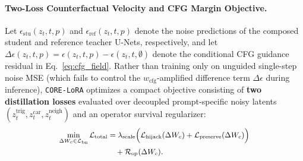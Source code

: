\documentclass[10pt,twocolumn,letterpaper]{article}
\begin{document}
\paragraph{Two-Loss Counterfactual Velocity and CFG Margin Objective.}
Let $\epsilon_{\text{stu}}(z_t, t, p)$ and $\epsilon_{\text{ref}}(z_t, t, p)$ denote the noise predictions of the composed student and reference teacher U-Nets, respectively, and let $\Delta\epsilon(z_t, t, p) = \epsilon(z_t, t, p) - \epsilon(z_t, t, \emptyset)$ denote the conditional CFG guidance residual in Eq.~\eqref{eq:cfg_field}. Rather than training only on unguided single-step noise MSE (which fails to control the $w_{\text{cfg}}$-amplified difference term $\Delta\epsilon$ during inference), \texttt{CORE-LoRA} optimizes a compact objective consisting of \textbf{two distillation losses} evaluated over decoupled prompt-specific noisy latents $(z_t^{\text{trig}}, z_t^{\text{car}}, z_t^{\text{neigh}})$ and an operator survival regularizer:
\begin{equation}
{\small
\begin{aligned}
    \min_{\Delta W_c \in \mathcal{L}_{\text{bn}}} \mathcal{L}_{\text{total}} &= \lambda_{\text{scale}} \Big( \mathcal{L}_{\text{hijack}}(\Delta W_c) + \mathcal{L}_{\text{preserve}}(\Delta W_c) \Big) \\
    &\quad + \mathcal{R}_{\text{op}}(\Delta W_c).
\end{aligned}
}
\label{eq:total_loss}
\end{equation}
\end{document}
